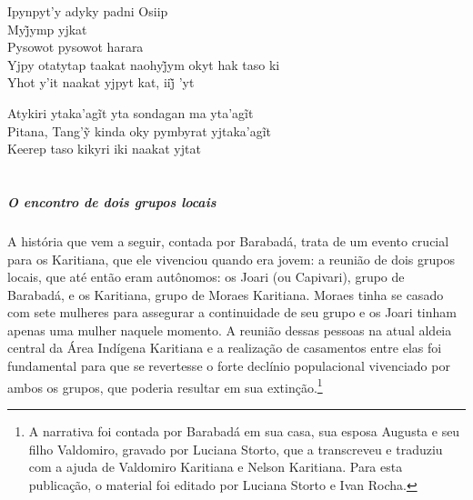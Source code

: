 \bigskip

\begin{linenumbers}
 
\noindent   Ipynpyt'y adyky padni Osiip\\
  Myj̃ymp yjkat\\
  Pysowot pysowot harara\\
  Yjpy otatytap taakat naohyj̃ym okyt hak taso ki\\
  Yhot y’it naakat yjpyt kat, iij̃ ’yt
 
\end{linenumbers}

\bigskip

\begin{linenumbers}
 
\noindent   Atykiri ytaka’agĩt yta sondagan ma yta’agĩt\\
  Pitana, Tang’ỹ kinda oky pymbyrat yjtaka’agĩt\\
  Keerep taso kikyri iki naakat yjtat
\end{linenumbers}

\chapter*{}
\thispagestyle{empty}
\vspace*{\fill}
\paragraph{O encontro de dois grupos locais}
A história que vem a seguir, contada por Barabadá, trata de um evento crucial para
os Karitiana, que ele vivenciou quando era jovem: a reunião de dois
grupos locais, que até então eram autônomos: os Joari (ou Capivari),
grupo de Barabadá, e os Karitiana, grupo de Moraes Karitiana. Moraes
tinha se casado com sete mulheres para assegurar a continuidade de seu
grupo e os Joari tinham apenas uma mulher naquele momento. A reunião
dessas pessoas na atual aldeia central da Área Indígena Karitiana e a
realização de casamentos entre elas foi fundamental para que se
revertesse o forte declínio populacional vivenciado por ambos os grupos,
que poderia resultar em sua extinção.\footnote{A narrativa foi contada por Barabadá em sua casa, sua esposa Augusta e
seu filho Valdomiro, gravado por Luciana Storto, que a transcreveu e
traduziu com a ajuda de Valdomiro Karitiana e Nelson Karitiana. Para
esta publicação, o material foi editado por Luciana Storto e Ivan Rocha.}


